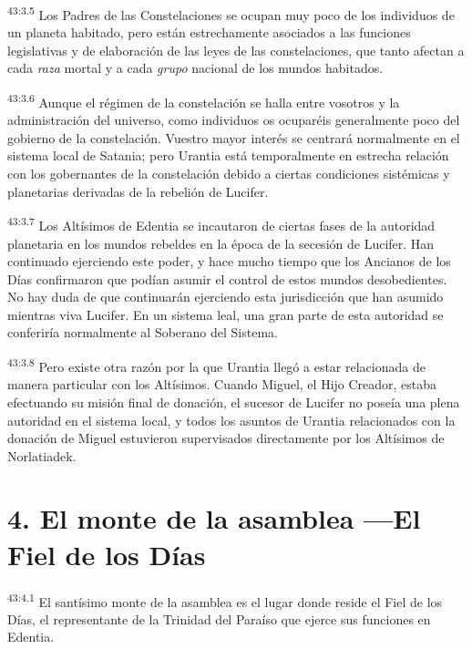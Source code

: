 \par
\textsuperscript{43:3.5} Los Padres de las Constelaciones se ocupan muy poco de los individuos de un planeta habitado, pero están estrechamente asociados a las funciones legislativas y de elaboración de las leyes de las constelaciones, que tanto afectan a cada \textit{raza} mortal y a cada \textit{grupo} nacional de los mundos habitados.

\par
\textsuperscript{43:3.6} Aunque el régimen de la constelación se halla entre vosotros y la administración del universo, como individuos os ocuparéis generalmente poco del gobierno de la constelación. Vuestro mayor interés se centrará normalmente en el sistema local de Satania; pero Urantia está temporalmente en estrecha relación con los gobernantes de la constelación debido a ciertas condiciones sistémicas y planetarias derivadas de la rebelión de Lucifer.

\par
\textsuperscript{43:3.7} Los Altísimos de Edentia se incautaron de ciertas fases de la autoridad planetaria en los mundos rebeldes en la época de la secesión de Lucifer. Han continuado ejerciendo este poder, y hace mucho tiempo que los Ancianos de los Días confirmaron que podían asumir el control de estos mundos desobedientes. No hay duda de que continuarán ejerciendo esta jurisdicción que han asumido mientras viva Lucifer. En un sistema leal, una gran parte de esta autoridad se conferiría normalmente al Soberano del Sistema.

\par
\textsuperscript{43:3.8} Pero existe otra razón por la que Urantia llegó a estar relacionada de manera particular con los Altísimos. Cuando Miguel, el Hijo Creador, estaba efectuando su misión final de donación, el sucesor de Lucifer no poseía una plena autoridad en el sistema local, y todos los asuntos de Urantia relacionados con la donación de Miguel estuvieron supervisados directamente por los Altísimos de Norlatiadek.

\section*{4. El monte de la asamblea ---El Fiel de los Días}
\par
\textsuperscript{43:4.1} El santísimo monte de la asamblea es el lugar donde reside el Fiel de los Días, el representante de la Trinidad del Paraíso que ejerce sus funciones en Edentia.

